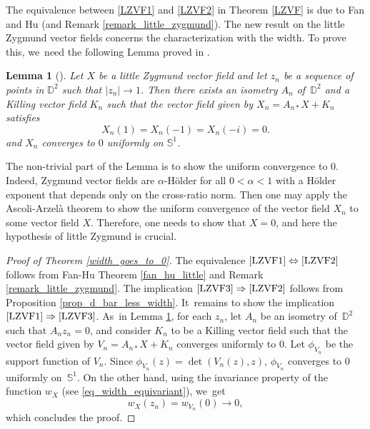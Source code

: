 \documentclass[11pt]{article}
\theoremstyle{plain}
\newtheorem{lemma}[cor]{Lemma}
\theoremstyle{definition}
\begin{document}
The equivalence between \eqref{LZVF1} and \eqref{LZVF2} in Theorem \ref{LZVF} is due to Fan and Hu \cite{FanJun} (and Remark \ref{remark_little_zygmund}). The new result on the little Zygmund vector fields concerns the characterization with the width. To prove this, we~need the following Lemma proved in \cite{FanJun}.

\begin{lemma}[{\cite[p.\,1167]{FanJun}}]
\label{teck_little}
Let $X$ be a little Zygmund vector field and let $z_n$ be a sequence of points in $\mathbb{D}^2$ such that $\lvert z_n\rvert\to1$. Then there exists an isometry $A_n$ of~$\mathbb{D}^2$ and a Killing vector field $K_n$ such that the vector field given by $X_n=A_{n*}X+K_n$ satisfies\vspace*{-3pt}
\[
X_n(1)=X_n(-1)=X_n(-i)=0.
\]
and $X_n$ converges to $0$ uniformly on $\mathbb{S}^1$.
\end{lemma}

The non-trivial part of the Lemma is to show the uniform convergence to $0$. Indeed, Zygmund vector fields are $\alpha$-Hölder for all $0<\alpha<1$ with a Hölder exponent that depends only on the cross-ratio norm. Then one may apply the Ascoli-Arzelà theorem to show the uniform convergence of the vector field $X_n$ to some vector field $X$. Therefore, one needs to show that $X=0$, and here the hypothesis of little Zygmund is crucial.

\begin{proof}[Proof of Theorem \ref{width_goes_to_0}]
The equivalence $\eqref{LZVF1}\Leftrightarrow\eqref{LZVF2}$ follows from Fan-Hu Theorem \ref{fan_hu_little} and Remark \ref{remark_little_zygmund}. The implication $\eqref{LZVF3}\Rightarrow\eqref{LZVF2}$ follows from Proposition \ref{prop_d_bar_less_width}. It~remains to show the implication $\eqref{LZVF1}\Rightarrow\eqref{LZVF3}$. As~in Lemma \ref{teck_little}, for each $z_n$, let $A_n$ be an isometry of~$\mathbb{D}^2$ such that $A_nz_n=0$, and consider $K_n$ to be a Killing vector field such that the vector field given by $V_n=A_{n*}X+K_n$ converges uniformly to $0$.
Let \(\phi_{V_n}\) be the support function of \(V_n\). Since \(\phi_{V_n}(z) = \det(V_n(z), z)\), \(\phi_{V_n}\) converges to \(0\) uniformly on~\(\mathbb{S}^1\). On the other hand, using the invariance property of the function \(w_X\) (see \eqref{eq_width_equivariant}), we~get
\[ w_X(z_n) = w_{V_n}(0) \to 0, \]
which concludes the proof.
\end{proof}
\end{document}
